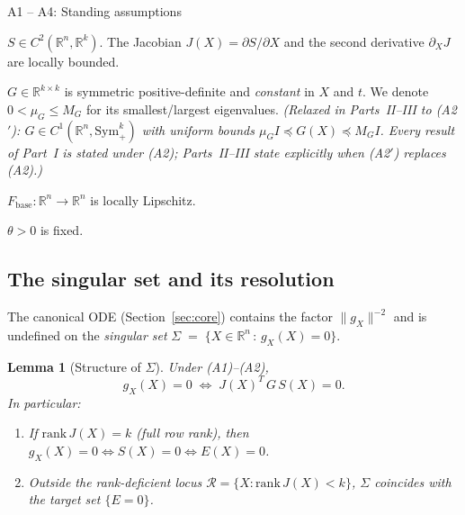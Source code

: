 \documentclass[11pt,oneside]{amsart}
\def\textbf#1{#1}%
\theoremstyle{plain}
\newtheorem{lemma}[theorem]{Lemma}
\theoremstyle{definition}
\newcommand{\gX}{g_X}
\newcommand{\Fbase}{F_{\mathrm{base}}}
\newcommand{\R}{\mathbb{R}}
\begin{document}
\begin{defbox}{A1 -- A4: Standing assumptions}
\begin{description}[leftmargin=2.4em, style=nextline]
\item[\textbf{(A1) Regularity of $S$.}]
      $S \in C^{2}(\R^{n}, \R^{k})$. The Jacobian $J(X)=\partial S/\partial X$
      and the second derivative $\partial_{X} J$ are locally bounded.
\item[\textbf{(A2) Metric.}]
      $G \in \R^{k\times k}$ is symmetric positive-definite and
      \emph{constant} in $X$ and $t$. We denote $0 < \mu_{G}\le M_{G}$
      for its smallest/largest eigenvalues. \emph{(Relaxed in Parts~II--III
      to (A2$'$): $G\in C^{1}(\R^{n},\mathrm{Sym}^{k}_{+})$ with uniform
      bounds $\mu_{G}I\preceq G(X)\preceq M_{G}I$. Every result of Part~I
      is stated under (A2); Parts~II--III state explicitly when (A2$'$)
      replaces (A2).)}
\item[\textbf{(A3) Nominal field.}]
      $\Fbase : \R^{n}\to\R^{n}$ is locally Lipschitz.
\item[\textbf{(A4) Control parameter.}]
      $\theta > 0$ is fixed.
\end{description}
\end{defbox}

\subsection{The singular set and its resolution}
\label{sec:singular}

The canonical ODE (Section~\ref{sec:core}) contains the factor
$\|\gX\|^{-2}$ and is undefined on the \emph{singular set}
\(
  \Sigma \;=\; \{X \in \R^{n}\,:\, \gX(X) = 0\}.
\)

\begin{lemma}[Structure of $\Sigma$]
\label{lem:singular}
Under (A1)--(A2),
\[
  \gX(X)=0
  \;\Longleftrightarrow\;
  J(X)^{T}\, G\, S(X) = 0.
\]
In particular:
\begin{enumerate}[leftmargin=2em, label=\textup{(\roman*)}]
  \item If $\mathrm{rank}\,J(X) = k$ (full row rank), then
        $\gX(X)=0 \Longleftrightarrow S(X)=0 \Longleftrightarrow E(X)=0$.
  \item Outside the rank-deficient locus
        $\mathcal{R} = \{X : \mathrm{rank}\,J(X) < k\}$,
        $\Sigma$ coincides with the target set $\{E=0\}$.
\end{enumerate}
\end{lemma}
\end{document}
